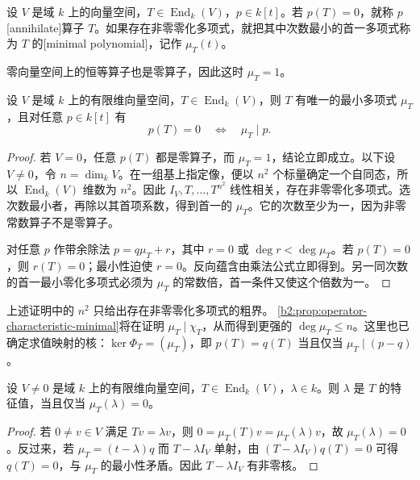 \begin{definition}\label{b2:def:minimal-polynomial}
	设 \(V\) 是域 \(k\) 上的向量空间，\(T\in\operatorname{End}_k(V)\)，\(p\in k[t]\)。若 \(p(T)=0\)，就称 \(p\) [annihilate]算子 \(T\)。如果存在非零零化多项式，就把其中次数最小的首一多项式称为 \(T\) 的[minimal polynomial]，记作 \(\mu_T(t)\)。
\end{definition}

零向量空间上的恒等算子也是零算子，因此这时 \(\mu_T=1\)。

\begin{proposition}\label{b2:prop:minimal-polynomial-divisibility}
	设 \(V\) 是域 \(k\) 上的有限维向量空间，\(T\in\operatorname{End}_k(V)\)，则 \(T\) 有唯一的最小多项式 \(\mu_T\)，且对任意 \(p\in k[t]\) 有
	\[
		p(T)=0\quad\Longleftrightarrow\quad \mu_T\mid p.
	\]
\end{proposition}
\begin{proof}
	若 \(V=0\)，任意 \(p(T)\) 都是零算子，而 \(\mu_T=1\)，结论立即成立。以下设 \(V\ne0\)，令 \(n=\dim_kV\)。在一组基上指定像，便以 \(n^2\) 个标量确定一个自同态，所以 \(\operatorname{End}_k(V)\) 维数为 \(n^2\)。因此 \(I_V,T,\ldots,T^{n^2}\) 线性相关，存在非零零化多项式。选次数最小者，再除以其首项系数，得到首一的 \(\mu_T\)。它的次数至少为一，因为非零常数算子不是零算子。

	对任意 \(p\) 作带余除法 \(p=q\mu_T+r\)，其中 \(r=0\) 或 \(\deg r<\deg \mu_T\)。若 \(p(T)=0\)，则 \(r(T)=0\)；最小性迫使 \(r=0\)。反向蕴含由乘法公式立即得到。另一同次数的首一最小零化多项式必须为 \(\mu_T\) 的常数倍，首一条件又使这个倍数为一。
\end{proof}

上述证明中的 \(n^2\) 只给出存在非零零化多项式的粗界。 \cref{b2:prop:operator-characteristic-minimal}将在证明 \(\mu_T\mid\chi_T\)，从而得到更强的 \(\deg \mu_T\le n\)。这里也已确定求值映射的核：\(\ker\Phi_T=(\mu_T)\)，即 \(p(T)=q(T)\) 当且仅当 \(\mu_T\mid(p-q)\)。

\begin{corollary}\label{b2:cor:eigenvalue-minimal-root}
	设 \(V\ne0\) 是域 \(k\) 上的有限维向量空间，\(T\in\operatorname{End}_k(V)\)，\(\lambda\in k\)。则 \(\lambda\) 是 \(T\) 的特征值，当且仅当 \(\mu_T(\lambda)=0\)。
\end{corollary}
\begin{proof}
	若 \(0\ne v\in V\) 满足 \(Tv=\lambda v\)，则 \(0=\mu_T(T)v=\mu_T(\lambda)v\)，故 \(\mu_T(\lambda)=0\)。反过来，若 \(\mu_T=(t-\lambda)q\) 而 \(T-\lambda I_V\) 单射，由 \((T-\lambda I_V)q(T)=0\) 可得 \(q(T)=0\)，与 \(\mu_T\) 的最小性矛盾。因此 \(T-\lambda I_V\) 有非零核。
\end{proof}

